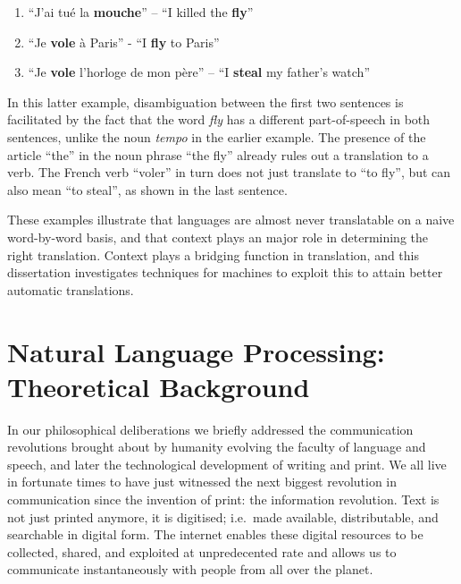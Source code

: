 \begin{enumerate}
\item ``J'ai tué la \textbf{mouche}'' -- ``I killed the \textbf{fly}''
\item ``Je \textbf{vole} à Paris'' - ``I \textbf{fly} to Paris''
\item ``Je \textbf{vole} l'horloge de mon père'' -- ``I \textbf{steal} my father's watch''
\end{enumerate}

In this latter example, disambiguation between the first two sentences is
facilitated by the fact that the word \emph{fly} has a different
part-of-speech in both sentences, unlike the noun \emph{tempo} in the earlier example.
The presence of the article ``the'' in the noun phrase ``the fly'' already
rules out a translation to a verb. The French verb ``voler'' in turn does not
just translate to ``to fly'', but can also mean ``to steal'', as shown in
the last sentence. 

These examples illustrate that languages are almost never translatable on a naive
word-by-word basis, and that context plays an major role in determining the
right translation. Context plays a bridging function in translation, and this
dissertation investigates techniques for machines to exploit this to attain
better automatic translations.

\section{Natural Language Processing: Theoretical Background}

In our philosophical deliberations we briefly addressed the communication
revolutions brought about by humanity evolving the faculty of language and
speech, and later the technological development of writing and print. We all
live in fortunate times to have just witnessed the next biggest revolution in
communication since the invention of print: the information revolution. Text is
not just printed anymore, it is digitised; i.e.\ made available, distributable,
and searchable in digital form. The internet enables these digital resources to
be collected, shared, and exploited at unpredecented rate and allows us to
communicate instantaneously with people from all over the planet. 


